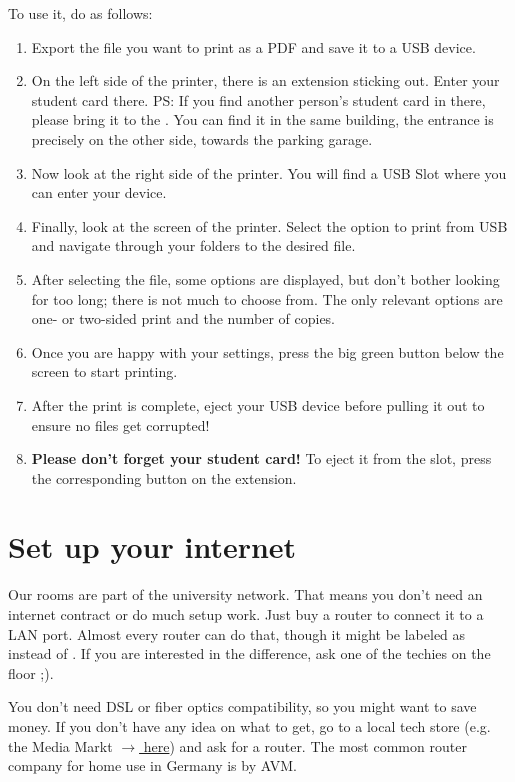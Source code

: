 To use it, do as follows:
\begin{enumerate}
    \item Export the file you want to print as a PDF and save it to a USB device.
    \item On the left side of the printer, there is an extension sticking out. Enter your student card there. PS: If you find another person's student card in there, please bring it to the . You can find it in the same building, the entrance is precisely on the other side, towards the parking garage.
    \item Now look at the right side of the printer. You will find a USB Slot where you can enter your device.
    \item Finally, look at the screen of the printer. Select the option to print from USB and navigate through your folders to the desired file.
    \item After selecting the file, some options are displayed, but don't bother looking for too long; there is not much to choose from. The only relevant options are one- or two-sided print and the number of copies.
    \item Once you are happy with your settings, press the big green button below the screen to start printing.
    \item After the print is complete, eject your USB device before pulling it out to ensure no files get corrupted!
    \item \textbf{Please don't forget your student card!} To eject it from the slot, press the corresponding button on the extension.
\end{enumerate}

\section{Set up your internet}
Our rooms are part of the university network. That means you don't need an internet contract or do much setup work. Just buy a router to connect it to a LAN port. Almost every router can do that, though it might be labeled as  instead of . If you are interested in the difference, ask one of the techies on the floor ;).

You don't need DSL or fiber optics compatibility, so you might want to save money. If you don't have any idea on what to get, go to a local tech store (e.g. the Media Markt \href{https://maps.app.goo.gl/XmRXQEo6ihkXH9jS9}{$\xrightarrow{}$ here}) and ask for a router. The most common router company for home use in Germany is  by AVM.


